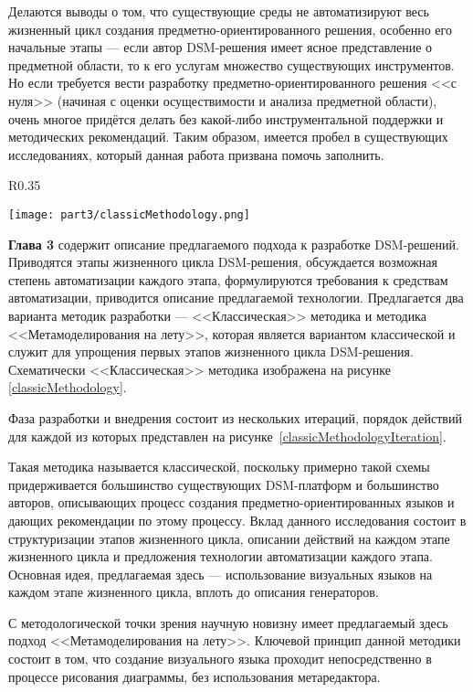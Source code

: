 Делаются выводы о том, что существующие среды не автоматизируют весь жизненный цикл
создания предметно-ориентированного решения, особенно его начальные этапы --- если автор DSM-решения 
имеет ясное представление о предметной области, то к его услугам множество существующих инструментов. 
Но если требуется вести разработку предметно-ориентированного решения <<с нуля>> (начиная 
с оценки осуществимости и анализа предметной области), очень многое придётся делать 
без какой-либо инструментальной поддержки и методических рекомендаций.
Таким образом, имеется пробел в существующих исследованиях, который данная работа
призвана помочь заполнить.

\begin{wrapfigure}{R}{0.35\textwidth}
	\begin{center}
		\texttt{[image: part3/classicMethodology.png]}
		\caption{<<Классическая>> методика разработки.}
		\label{classicMethodology}
	\end{center}
\end{wrapfigure}

\textbf{Глава 3} содержит описание предлагаемого подхода к разработке 
DSM-решений. Приводятся этапы жизненного цикла DSM-решения, обсуждается 
возможная степень автоматизации каждого этапа, формулируются требования к 
средствам автоматизации, приводится описание предлагаемой технологии. Предлагается
два варианта методик разработки --- <<Классическая>> методика и методика <<Метамоделирования
на лету>>, которая является вариантом классической и служит для упрощения первых этапов
жизненного цикла DSM-решения. Схематически <<Классическая>> методика изображена на рисунке
\ref{classicMethodology}.

Фаза разработки и внедрения состоит из нескольких итераций, порядок действий для каждой 
из которых представлен на рисунке~\ref{classicMethodologyIteration}. 

Такая методика называется классической, поскольку примерно такой схемы придерживается
большинство существующих DSM-платформ и большинство авторов, описывающих процесс создания
предметно-ориентированных языков и дающих рекомендации по этому процессу. Вклад данного 
исследования состоит в структуризации этапов жизненного цикла, описании действий на 
каждом этапе жизненного цикла и предложения технологии автоматизации каждого этапа.
Основная идея, предлагаемая здесь --- использование визуальных языков на каждом
этапе жизненного цикла, вплоть до описания генераторов.

С методологической точки зрения научную новизну имеет предлагаемый здесь подход 
<<Метамоделирования на лету>>. Ключевой принцип данной методики состоит в том, 
что создание визуального языка проходит непосредственно в процессе рисования диаграммы, 
без использования метаредактора.

